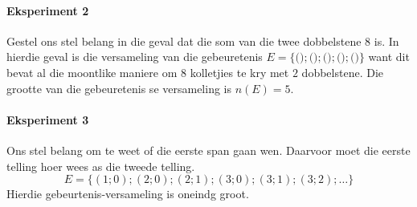 \paragraph{Eksperiment 2} Gestel ons stel belang in die geval dat die som van die twee dobbelstene $8$ is. In hierdie geval is die versameling van die gebeuretenis
$E=\{($$);($$);($$);($$);($$)\}$
want dit bevat al die moontlike maniere om $8$ kolletjies te kry met $2$ dobbelstene.
Die grootte van die gebeuretenis se versameling is \(n(E)=5\).


\paragraph{Eksperiment 3} Ons stel belang om te weet of die eerste span gaan wen. Daarvoor moet die eerste telling hoer wees as die tweede telling.
\[E=\{(1;0);(2;0);(2;1);(3;0);(3;1);(3;2);\ldots\}\]
Hierdie gebeurtenis-versameling is oneindg groot.

